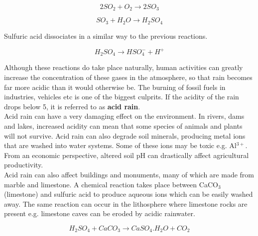 \begin{enumerate}
\begin{equation*}
2SO_{2} + O_{2} \rightarrow 2SO_{3} 
\end{equation*}

\begin{equation*}
SO_{3} + H_{2}O \rightarrow H_{2}SO_{4}
\end{equation*}

Sulfuric acid dissociates in a similar way to the previous reactions.

\begin{equation*}
H_{2}SO_{4} \rightarrow HSO_{4}^{-} + H^{+}
\end{equation*}

\end{enumerate}

Although these reactions do take place naturally, human activities can greatly increase the concentration of these gases in the atmosphere, so that rain becomes far more acidic than it would otherwise be. The burning of fossil fuels in industries, vehicles etc is one of the biggest culprits. If the acidity of the rain drops below 5, it is referred to as \textbf{acid rain}.\\

Acid rain can have a very damaging effect on the environment. In rivers, dams and lakes, increased acidity can mean that some species of animals and plants will not survive. Acid rain can also degrade soil minerals, producing metal ions that are washed into water systems. Some of these ions may be toxic e.g. Al$^{3+}$. From an economic perspective, altered soil pH can drastically affect agricultural productivity. \\

Acid rain can also affect buildings and monuments, many of which are made from marble and limestone. A chemical reaction takes place between CaCO$_{3}$ (limestone) and sulfuric acid to produce aqueous ions which can be easily washed away. The same reaction can occur in the lithosphere where limestone rocks are present e.g. limestone caves can be eroded by acidic rainwater.

\begin{equation*}
H_{2}SO_{4} + CaCO_{3} \rightarrow CaSO_{4}.H_{2}O + CO_{2}
\end{equation*}

